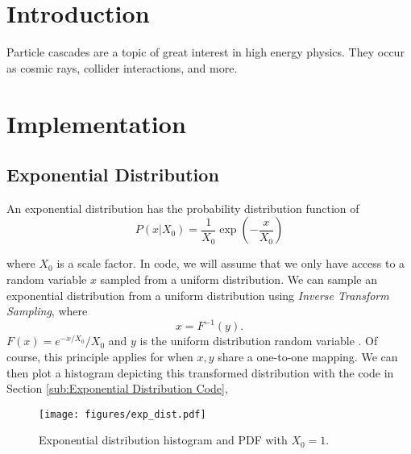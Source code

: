 \documentclass{article}
\title{\vspace{-3em}{\bf Studying High-Energy Particle Cascades with One-Dimensional Monte-Carlo Simulations}}
\author{Matt Ketkaroonkul}
\date{\today}
\begin{document}
\maketitle

\begin{abstract}
    Write the abstract last.
    
\end{abstract}

\section{Introduction} %
\label{sec:Introduction}
Particle cascades are a topic of great interest in high energy physics. They occur as cosmic rays, collider interactions, and more.

\section{Implementation} %
\label{sec:Implementation}
\subsection{Exponential Distribution} %
\label{sub:Exponential Distribution}
An exponential distribution has the probability distribution function of
\begin{equation}
    P(x|X_{0}) = \frac{1}{X_{0}} \exp \left( -\frac{x}{X_{0}} \right) 
\end{equation}

where \( X_{0} \) is a scale factor. In code, we will assume that we only have access to a random variable \( x \) sampled from a uniform distribution. We can sample an exponential distribution from a uniform distribution using \textit{Inverse Transform Sampling}, where
\begin{equation}
    x = F^{-1} (y) .
\end{equation}
\( F(x)= e^{-x / X_{0}} / X_{0} \) and \( y \) is the uniform distribution random variable \cite{bohm}. Of course, this principle applies for when \( x, y \) share a one-to-one mapping. We can then plot a histogram depicting this transformed distribution with the code in Section \ref{sub:Exponential Distribution Code},

\begin{figure}[htpb]
    \begin{center}
        \texttt{[image: figures/exp\_dist.pdf]}
    \end{center}
    \caption{Exponential distribution histogram and PDF with \( X_{0} = 1 \).}\label{fig:exp-dist}
\end{figure}
\end{document}

